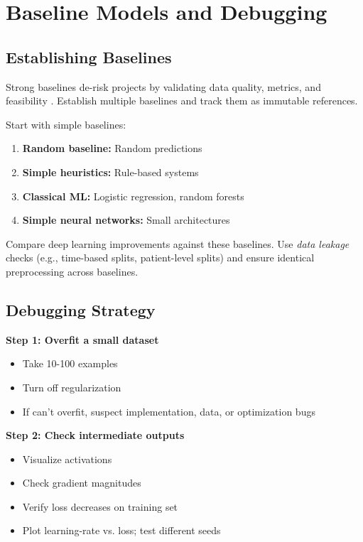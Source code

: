 
\section{Baseline Models and Debugging}
\label{sec:baselines-debugging}

\subsection{Establishing Baselines}

Strong baselines de-risk projects by validating data quality, metrics, and feasibility \textcite{GoodfellowEtAl2016,Prince2023}. Establish multiple baselines and track them as immutable references. 

Start with simple baselines:
\begin{enumerate}
    \item \textbf{Random baseline:} Random predictions
    \item \textbf{Simple heuristics:} Rule-based systems
    \item \textbf{Classical ML:} Logistic regression, random forests
    \item \textbf{Simple neural networks:} Small architectures
\end{enumerate}

Compare deep learning improvements against these baselines. Use \emph{data leakage}  checks (e.g., time-based splits, patient-level splits) and ensure identical preprocessing across baselines.

\subsection{Debugging Strategy}

\textbf{Step 1: Overfit a small dataset}
\begin{itemize}
    \item Take 10-100 examples
    \item Turn off regularization
    \item If can't overfit, suspect implementation, data, or optimization bugs
\end{itemize}

\textbf{Step 2: Check intermediate outputs}
\begin{itemize}
    \item Visualize activations
    \item Check gradient magnitudes
    \item Verify loss decreases on training set
    \item Plot learning-rate vs. loss; test different seeds
\end{itemize}

